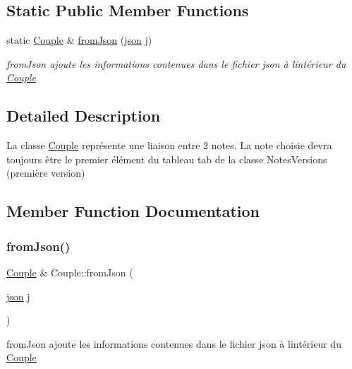 \subsection*{Static Public Member Functions}
\begin{DoxyCompactItemize}
\item 
static \hyperlink{classCouple}{Couple} \& \hyperlink{classCouple_a77415b206cf9155e5fa6d9e64a9a03f9}{from\+Json} (\hyperlink{classnlohmann_1_1basic__json}{json} j)
\begin{DoxyCompactList}\small\item\em from\+Json ajoute les informations contenues dans le fichier json à l\textquotesingle{}intérieur du \hyperlink{classCouple}{Couple} \end{DoxyCompactList}\end{DoxyCompactItemize}


\subsection{Detailed Description}
La classe \hyperlink{classCouple}{Couple} représente une liaison entre 2 notes. La note choisie devra toujours être le premier élément du tableau tab de la classe Notes\+Versions (première version) 

\subsection{Member Function Documentation}
\mbox{\label{classCouple_a77415b206cf9155e5fa6d9e64a9a03f9}} 
\subsubsection{\texorpdfstring{from\+Json()}{fromJson()}}
{\footnotesize\ttfamily \hyperlink{classCouple}{Couple} \& Couple\+::from\+Json (\begin{DoxyParamCaption}\item[{\hyperlink{classnlohmann_1_1basic__json}{json}}]{j }\end{DoxyParamCaption})\hspace{0.3cm}{\ttfamily [static]}}



from\+Json ajoute les informations contenues dans le fichier json à l\textquotesingle{}intérieur du \hyperlink{classCouple}{Couple} 


